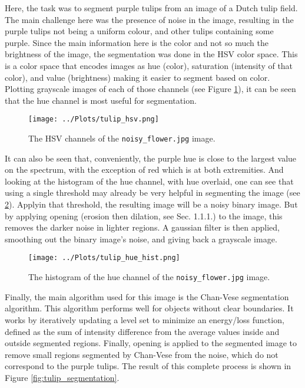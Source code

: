 \documentclass[12pt]{report} %
\begin{document}
Here, the task was to segment purple tulips from an image of a Dutch tulip field. The main challenge here was the presence of noise in the image, resulting in the purple tulips not being a uniform colour, and other tulips containing some purple. Since the main information here is the color and not so much the brightness of the image, the segmentation was done in the HSV color space. This is a color space that encodes images as hue (color), saturation (intensity of that color), and value (brightness) making it easier to segment based on color\cite{wiki_hsv}. Plotting grayscale images of each of those channels (see Figure \ref{fig:flower_hsv}), it can be seen that the hue channel is most useful for segmentation.

\begin{figure}[htbp]
    \centering
    \texttt{[image: ../Plots/tulip\_hsv.png]}
    \caption{The HSV channels of the \texttt{noisy\_flower.jpg} image.}
    \label{fig:flower_hsv}
\end{figure}

It can also be seen that, conveniently, the purple hue is close to the largest value on the spectrum, with the exception of red which is at both extremities. And looking at the histogram of the hue channel, with hue overlaid, one can see that using a single threshold may already be very helpful in segmenting the image (see \ref{fig:hsv_hist}). Applyin that threshold, the resulting image will be a noisy binary image. But by applying opening (erosion then dilation, see Sec. 1.1.1.) to the image, this removes the darker noise in lighter regions. A gaussian filter is then applied\cite[pp. 166-170]{gonzalez2002digital}, smoothing out the binary image's noise, and giving back a grayscale image.

\begin{figure}[htbp]
    \centering
    \texttt{[image: ../Plots/tulip\_hue\_hist.png]}
    \caption{The histogram of the hue channel of the \texttt{noisy\_flower.jpg} image.}
    \label{fig:hsv_hist}
\end{figure}

Finally, the main algorithm used for this image is the Chan-Vese segmentation algorithm\cite{chan1999active}. This algorithm performs well for objects without clear boundaries. It works by iteratively updating a level set to minimize an energy/loss function, defined as the sum of intensity difference from the average values inside and outside segmented regions\cite{skimage_chan_vese}. Finally, opening is applied to the segmented image to remove small regions segmented by Chan-Vese from the noise, which do not correspond to the purple tulips. The result of this complete process is shown in Figure \ref{fig:tulip_segmentation}.
\end{document}
